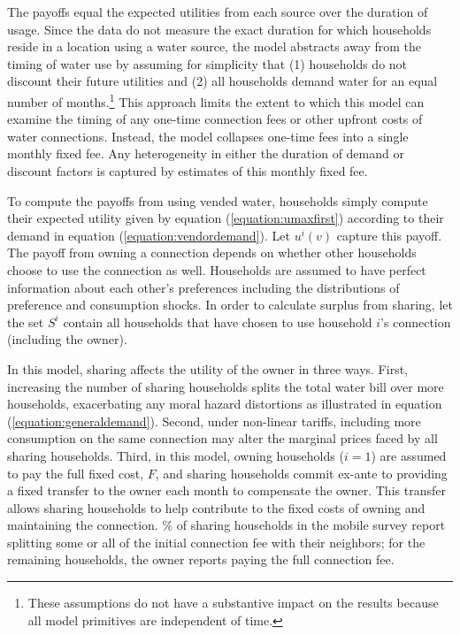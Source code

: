 \documentclass[12pt]{article}
\begin{document}
The payoffs equal the expected utilities from each source over the duration of usage.  Since the data do not measure the exact duration for which households reside in a location using a water source, the model abstracts away from the timing of water use by assuming for simplicity that (1) households do not discount their future utilities and (2) all households demand water for an equal number of months.\footnote{These assumptions do not have a substantive impact on the results because all model primitives are independent of time.}  This approach limits the extent to which this model can examine the timing of any one-time connection fees or other upfront costs of water connections.  Instead, the model collapses one-time fees into a single monthly fixed fee.  Any heterogeneity in either the duration of demand or discount factors is captured by estimates of this monthly fixed fee.  

To compute the payoffs from using vended water, households simply compute their expected utility given by equation (\ref{equation:umaxfirst}) according to their demand in equation (\ref{equation:vendordemand}).  Let $u^{i}(v)$ capture this payoff.  The payoff from owning a connection depends on whether other households choose to use the connection as well.  Households are assumed to have perfect information about each other's preferences including the distributions of preference and consumption shocks.  In order to calculate surplus from sharing, let the set $S^{i}$ contain all households that have chosen to use household $i$'s connection (including the owner).  

In this model, sharing affects the utility of the owner in three ways.  First, increasing the number of sharing households splits the total water bill over more households, exacerbating any moral hazard distortions as illustrated in equation (\ref{equation:generaldemand}).  Second, under non-linear tariffs, including more consumption on the same connection may alter the marginal prices faced by all sharing households.  Third, in this model, owning households ($i=1$) are assumed to pay the full fixed cost, $F$, and sharing households commit ex-ante to providing a fixed transfer to the owner each month to compensate the owner.  This transfer allows sharing households to help contribute to the fixed costs of owning and maintaining the connection.  \unskip\% of sharing households in the mobile survey report splitting some or all of the initial connection fee with their neighbors; for the remaining households, the owner reports paying the full connection fee.  
\end{document}
